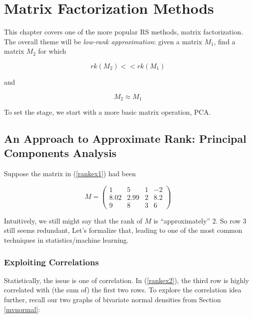 
\chapter{Matrix Factorization Methods}    

This chapter covers one of the more popular RS methods, matrix
factorization.  The overall theme will be \textit{low-rank
approximation}:  given a matrix $M_1$,  find a matrix $M_2$ for which 

\begin{equation}
rk(M_2) << rk(M_1)
\end{equation}

and 

\begin{equation}
M_2 \approx M_1
\end{equation}


To set the stage, we start with a more basic matrix
operation, PCA.

\section{An Approach to Approximate Rank:  Principal Components
Analysis}

Suppose the matrix in (\ref{rankex1}) had been

\begin{equation}
\label{rankex2}  
M =
\left (
\begin{array}{rrrr}
1 & 5 & 1 & -2\\
8.02 & 2.99 & 2 & 8.2\\
9 & 8 & 3 & 6 
\end{array}
\right )
\end{equation}

Intuitively, we still might say that the rank of $M$ is
``approximately'' 2.  So row 3 still seems redundant, Let's
formalize that, leading to one of the most common techniques in
statistics/machine learning.  

\subsection{Exploiting Correlations}
\label{explorecorr}

Statistically, the issue is one of correlation.  In (\ref{rankex2}), the
third row is highly correlated with (the sum of) the first two rows.  To
explore the correlation idea further, recall our two graphs of bivariate
normal densities from Section \ref{mvnormal}:

